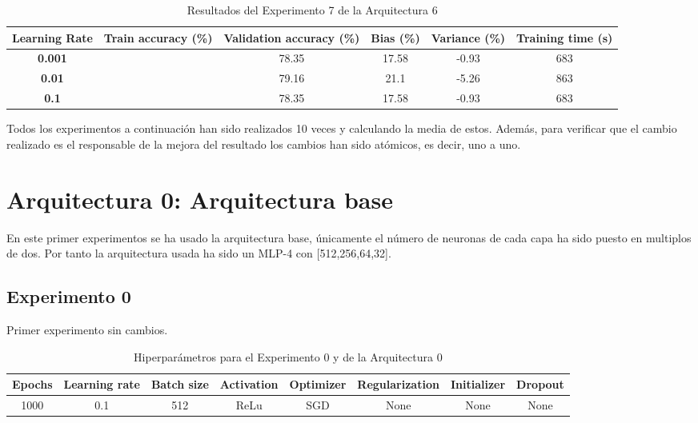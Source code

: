 \documentclass{article}
\begin{document}
   \begin{table}[!h]
				\begin{center}
					\begin{tabular}{ c | c | c | c | c | c |}
						 \textbf{Learning Rate} & \textbf{Train accuracy (\%)} & \textbf{Validation accuracy (\%)} & \textbf{Bias (\%)} & \textbf{Variance (\%)} & \textbf{Training time (s)} \\ \hline
	
                        \textbf{0.001} &    &  78.35& 17.58 & -0.93 &   683  \\ \hline
                        \textbf{0.01} &      & 79.16& 21.1 & -5.26 &   863  \\ \hline
                        \textbf{0.1} &   &  78.35& 17.58 & -0.93 &   683  \\ \hline
					\end{tabular}
					\caption{Resultados del Experimento 7 de la Arquitectura 6}
					\label{tab:res-a2-e5}
				\end{center}
			\end{table}

	Todos los experimentos a continuaci\'on han sido realizados 10 veces y calculando la media de estos.
Adem\'as, para verificar que el cambio realizado es el responsable de la mejora del resultado los cambios han sido at\'omicos, es decir, uno a uno.
	\section{Arquitectura 0: Arquitectura base}

	\label{j-s-a0} %
		En este primer experimentos se ha usado la arquitectura base, \'unicamente el n\'umero de neuronas de cada capa ha sido puesto en multiplos de dos. 
        Por tanto la arquitectura usada ha sido un MLP-4 con [512,256,64,32].
		
		\subsection{Experimento 0}
		\label{j-s-a0-e0} %
			Primer experimento sin cambios.
			
			\begin{table}[!h]
				\begin{center}
					\begin{tabular}{| c | c | c | c | c | c | c | c |}
						\textbf{Epochs} & \textbf{Learning rate} & \textbf{Batch size} & \textbf{Activation} & \textbf{Optimizer} & \textbf{Regularization} & \textbf{Initializer} & \textbf{Dropout}\\ \hline
						1000 & 0.1 & 512 & ReLu & SGD & None & None & None
					\end{tabular}
					\caption{Hiperpar\'ametros para el Experimento 0 y de la Arquitectura 0}
					\label{tab:hip-j-a0-e0}
				\end{center}
			\end{table}
			
\end{document}
